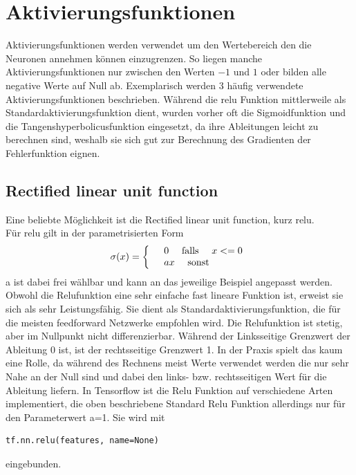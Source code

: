 \section{Aktivierungsfunktionen}
Aktivierungsfunktionen werden verwendet um den Wertebereich den die Neuronen annehmen können einzugrenzen. So liegen manche Aktivierungsfunktionen nur zwischen den Werten $-1$ und $1$ oder bilden alle negative Werte auf Null ab. Exemplarisch werden 3 häufig verwendete Aktivierungsfunktionen beschrieben.
Während die relu Funktion mittlerweile als Standardaktivierungsfunktion dient, wurden vorher oft die Sigmoidfunktion und die Tangenshyperbolicusfunktion eingesetzt, da ihre Ableitungen leicht zu berechnen sind, weshalb sie sich gut zur Berechnung des Gradienten der Fehlerfunktion eignen.
\subsection{Rectified linear unit function}  \label{sub:relu}
Eine beliebte Möglichkeit ist die Rectified linear unit function, kurz relu.\\
Für relu gilt in der parametrisierten Form\cite{Goodfellow}
\begin{align*}
\sigma(x)=
\left\{
\begin{array}{l l}
& 0 \quad \text{   falls  } \quad x <= 0  \\ 
& ax \quad \text{   sonst}
\end{array}
\right.
\end{align*}
a ist dabei frei wählbar und kann an das jeweilige Beispiel angepasst werden. Obwohl die Relufunktion eine sehr einfache fast lineare Funktion ist, erweist sie sich als sehr Leistungsfähig. Sie dient als Standardaktivierungsfunktion, die für die meisten feedforward Netzwerke empfohlen wird.\cite{Goodfellow} 
Die Relufunktion ist stetig, aber im Nullpunkt nicht differenzierbar.\cite{cookbook} Während der Linksseitige Grenzwert der Ableitung 0 ist, ist der rechtsseitige Grenzwert 1. In der Praxis spielt das kaum eine Rolle, da während des Rechnens meist Werte verwendet werden die nur sehr Nahe an der Null sind und dabei den links- bzw. rechtsseitigen Wert für die Ableitung liefern.\cite{Goodfellow} In Tensorflow ist die Relu Funktion auf verschiedene Arten implementiert, die oben beschriebene Standard Relu Funktion allerdings nur für den Parameterwert a=1. Sie wird mit \cite{cookbook}
\begin{lstlisting}
tf.nn.relu(features, name=None)
\end{lstlisting} 
eingebunden.
